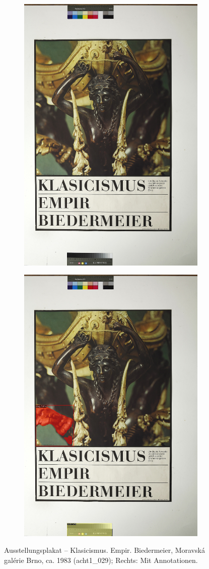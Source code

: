 \documentclass[a4paper,12pt,ngerman]{article}
\begin{document}
\newpage
\begin{landscape}
\begin{figure}[ht]
	\begin{subfigure}[b]{0.5\linewidth}
	\centering
	\includegraphics[height=\linewidth]{Abbildung_36_(acht1_029)}
	\end{subfigure}
	\begin{subfigure}[b]{0.5\linewidth}
	\centering
	\includegraphics[height=\linewidth]{Abbildung_36_(acht1_029)_with_detections}
	\end{subfigure}
	\caption{Ausstellungsplakat -- Klasicismus. Empir. Biedermeier, Moravská galérie Brno, ca. 1983 (acht1\_029); Rechts: Mit Annotationen.}
\end{figure}
\end{landscape}
\end{document}
